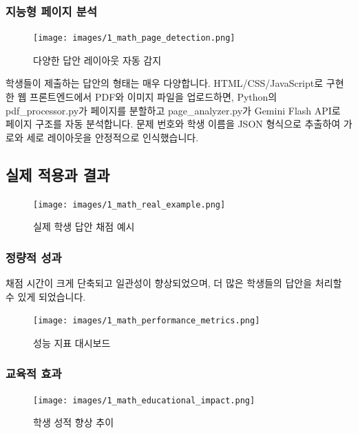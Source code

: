 \subsubsection{지능형 페이지 분석}

\begin{figure}[H]
    \centering
    \texttt{[image: images/1\_math\_page\_detection.png]}
    \caption{다양한 답안 레이아웃 자동 감지}
    \label{fig:math_page_detection}
\end{figure}

학생들이 제출하는 답안의 형태는 매우 다양합니다. HTML/CSS/JavaScript로 구현한 웹 프론트엔드에서 PDF와 이미지 파일을 업로드하면, Python의 pdf\_processor.py가 페이지를 분할하고 page\_analyzer.py가 Gemini Flash API로 페이지 구조를 자동 분석합니다. 문제 번호와 학생 이름을 JSON 형식으로 추출하여 가로와 세로 레이아웃을 안정적으로 인식했습니다.

\subsection{실제 적용과 결과}

\begin{figure}[H]
    \centering
    \texttt{[image: images/1\_math\_real\_example.png]}
    \caption{실제 학생 답안 채점 예시}
    \label{fig:math_real_example}
\end{figure}

\subsubsection{정량적 성과}

채점 시간이 크게 단축되고 일관성이 향상되었으며, 더 많은 학생들의 답안을 처리할 수 있게 되었습니다.

\begin{figure}[H]
    \centering
    \texttt{[image: images/1\_math\_performance\_metrics.png]}
    \caption{성능 지표 대시보드}
    \label{fig:math_performance_metrics}
\end{figure}

\subsubsection{교육적 효과}

\begin{figure}[H]
    \centering
    \texttt{[image: images/1\_math\_educational\_impact.png]}
    \caption{학생 성적 향상 추이}
    \label{fig:math_educational_impact}
\end{figure}

